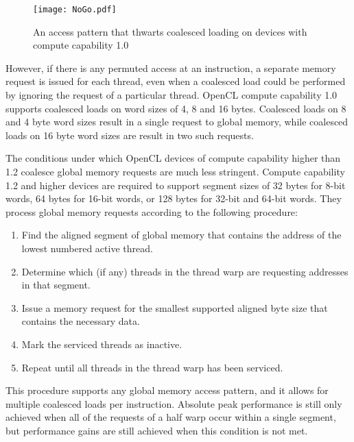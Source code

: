 \documentclass[12pt,twoside]{reedthesis}
\begin{document}
\begin{figure}[h!]
\begin{center}
\texttt{[image: NoGo.pdf]}
\end{center}
\caption{An access pattern that thwarts coalesced loading on devices with compute capability 1.0}
\end{figure}
\label{nogo}
\vspace{1pc}

However, if there is any permuted access at an instruction, a separate memory request is issued for each thread, even when a coalesced load could be performed by ignoring the request of a particular thread. OpenCL compute capability 1.0 supports coalesced loads on word sizes of 4, 8 and 16 bytes. Coalesced loads on 8 and 4 byte word sizes result in a single request to global memory, while coalesced loads on 16 byte word sizes are result in two such requests. 

The conditions under which OpenCL devices of compute capability higher than 1.2 coalesce global memory requests are much less stringent.  Compute capability 1.2 and higher devices are required to support segment sizes of 32 bytes for 8-bit words, 64 bytes for 16-bit words, or 128 bytes for 32-bit and 64-bit words. They process global memory requests according to the following procedure:

\begin{enumerate}
\item Find the aligned segment of global memory that contains the address of the lowest numbered active thread.

\item Determine which (if any) threads in the thread warp are requesting addresses in that segment.

\item Issue a memory request for the smallest supported aligned byte size that contains the necessary data.

\item Mark the serviced threads as inactive.

\item Repeat until all threads in the thread warp has been serviced.
\end{enumerate}

This procedure supports any global memory access pattern, and it allows for multiple coalesced loads per instruction. Absolute peak performance is still only achieved when all of the requests of a half warp occur within a single segment, but performance gains are still achieved when this condition is not met.
\end{document}
